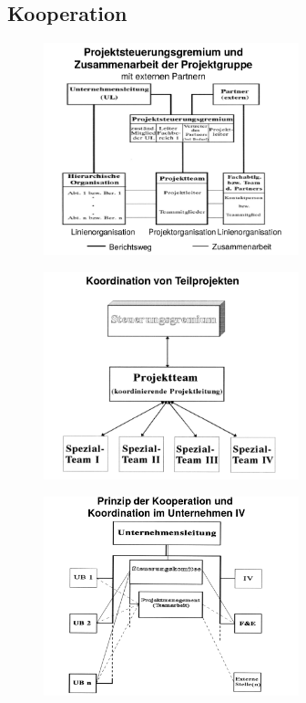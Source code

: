 \documentclass[11pt,a4paper]{article}
\begin{document}
\subsection{Kooperation}

\begin{figure}[H]
	\centering

	\includegraphics[width=0.66\textwidth]{ch4/projektgruppe}

\end{figure}	

\begin{figure}[H]
	\centering

	\includegraphics[width=0.66\textwidth]{ch4/teilprojekt}

\end{figure}	

\begin{figure}[H]
	\centering

	\includegraphics[width=0.66\textwidth]{ch4/kooperation}

\end{figure}	
\pagebreak
\end{document}
